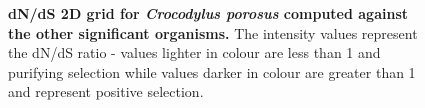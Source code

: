 \documentclass{article}
\begin{document}
\begin{figure}[H]
\centering
{}
\caption{\textbf{dN/dS 2D grid for \textit{Crocodylus porosus} computed against the other significant organisms.} The intensity values represent the dN/dS ratio - values lighter in colour are less than 1 and purifying selection while values darker in colour are greater than 1 and represent positive selection.}
\label{sup_fig_22}
\end{figure}
\end{document}

